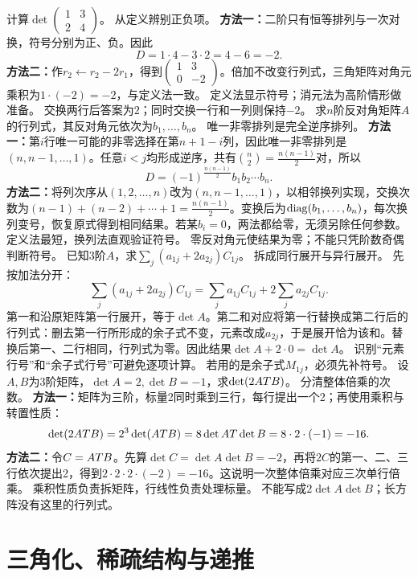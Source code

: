 {计算$\det\begin{pmatrix}1&3\\2&4\end{pmatrix}$。}
{从定义辨别正负项。}
{\textbf{方法一：}二阶只有恒等排列与一次对换，符号分别为正、负。因此
\[D=1\cdot4-3\cdot2=4-6=-2.\]
\textbf{方法二：}作$r_2\leftarrow r_2-2r_1$，得到$\begin{pmatrix}1&3\\0&-2\end{pmatrix}$。倍加不改变行列式，三角矩阵对角元乘积为$1\cdot(-2)=-2$，与定义法一致。}
{定义法显示符号；消元法为高阶情形做准备。}
{交换两行后答案为$2$；同时交换一行和一列则保持$-2$。}
{求$n$阶反对角矩阵$A$的行列式，其反对角元依次为$b_1,\ldots,b_n$。}
{唯一非零排列是完全逆序排列。}
{\textbf{方法一：}第$i$行唯一可能的非零选择在第$n+1-i$列，因此唯一非零排列是$(n,n-1,\ldots,1)$。任意$i<j$均形成逆序，共有$\binom n2=\frac{n(n-1)}{2}$对，所以
\[D=(-1)^{\frac{n(n-1)}{2}}b_1b_2\cdots b_n.\]
\textbf{方法二：}将列次序从$(1,2,\ldots,n)$改为$(n,n-1,\ldots,1)$，以相邻换列实现，交换次数为$(n-1)+(n-2)+\cdots+1=\frac{n(n-1)}{2}$。变换后为$\operatorname{diag}(b_1,\ldots,b_n)$，每次换列变号，恢复原式得到相同结果。若某$b_i=0$，两法都给零，无须另除任何参数。}
{定义法最短，换列法直观验证符号。}
{零反对角元使结果为零；不能只凭阶数奇偶判断符号。}
{已知$3$阶$A$，求$\sum_j(a_{1j}+2a_{2j})C_{1j}$。}
{拆成同行展开与异行展开。}
{先按加法分开：
\[\sum_j(a_{1j}+2a_{2j})C_{1j}=\sum_ja_{1j}C_{1j}+2\sum_ja_{2j}C_{1j}.\]
第一和沿原矩阵第一行展开，等于$\det A$。第二和对应将第一行替换成第二行后的行列式：删去第一行所形成的余子式不变，元素改成$a_{2j}$，于是展开恰为该和。替换后第一、二行相同，行列式为零。因此结果$\det A+2\cdot0=\det A$。}
{识别“元素行号”和“余子式行号”可避免逐项计算。}
{若用的是余子式$M_{1j}$，必须先补符号。}
{设$A,B$为$3$阶矩阵，$\det A=2,\det B=-1$，求$\det(2AT B)$。}
{分清整体倍乘的次数。}
{\textbf{方法一：}矩阵为三阶，标量2同时乘到三行，每行提出一个2；再使用乘积与转置性质：
\[\det(2AT B)=2^3\det(AT B)=8\det AT\det B=8\cdot2\cdot(-1)=-16.\]
\textbf{方法二：}令$C=AT B$。先算$\det C=\det A\det B=-2$，再将$2C$的第一、二、三行依次提出2，得到$2\cdot2\cdot2\cdot(-2)=-16$。这说明一次整体倍乘对应三次单行倍乘。}
{乘积性质负责拆矩阵，行线性负责处理标量。}
{不能写成$2\det A\det B$；长方阵没有这里的行列式。}


\section{三角化、稀疏结构与递推}
